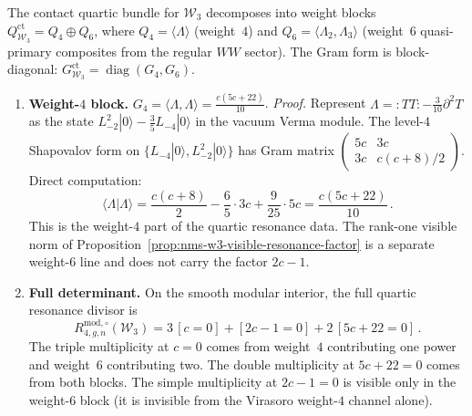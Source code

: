 \begin{theorem}%
\label{thm:nms-w3-full-quartic-gram}%
%
%
The contact quartic bundle for $\mathcal W_3$ decomposes into
weight blocks $Q^{\mathrm{ct}}_{\mathcal W_3} = Q_4 \oplus Q_6$, where
$Q_4 = \langle\Lambda\rangle$ (weight~$4$) and
$Q_6 = \langle\Lambda_2,\Lambda_3\rangle$ (weight~$6$
quasi-primary composites from the regular $WW$ sector).
The Gram form is block-diagonal:
$G^{\mathrm{ct}}_{\mathcal W_3} = \operatorname{diag}(G_4, G_6)$.
\begin{enumerate}[label=\textup{(\roman*)}]
\item \textbf{Weight-$4$ block.}
 $G_4 = \langle\Lambda,\Lambda\rangle = \frac{c(5c+22)}{10}$.
 \emph{Proof.} Represent $\Lambda = :TT: - \frac{3}{10}\partial^2 T$
 as the state $L_{-2}^2|0\rangle - \frac{3}{5}L_{-4}|0\rangle$
 in the vacuum Verma module. The level-$4$ Shapovalov form on
 $\{L_{-4}|0\rangle, L_{-2}^2|0\rangle\}$ has Gram matrix
 $\left(\begin{smallmatrix} 5c & 3c \\ 3c & c(c+8)/2 \end{smallmatrix}\right)$.
 Direct computation:
 \begin{equation}\label{eq:w3-lambda-norm}
 \langle\Lambda|\Lambda\rangle
 = \frac{c(c+8)}{2} - \frac{6}{5}\cdot 3c + \frac{9}{25}\cdot 5c
 = \frac{c(5c+22)}{10}\,.
 \end{equation}
 This is the weight-$4$ part of the quartic resonance data. The
 rank-one visible norm of
 Proposition~\textup{\ref{prop:nms-w3-visible-resonance-factor}}
 is a separate weight-$6$ line and does not carry the factor
 $2c-1$.

\item \textbf{Full determinant.}
 On the smooth modular interior, the full quartic resonance divisor is
 \begin{equation}\label{eq:w3-full-quartic-divisor}
 R^{\mathrm{mod},\circ}_{4,g,n}(\mathcal W_3)
 = 3\,[c{=}0] + [2c{-}1{=}0] + 2\,[5c{+}22{=}0]\,.
 \end{equation}
 The triple multiplicity at $c=0$ comes from weight~$4$
 contributing one power and weight~$6$ contributing two.
 The double multiplicity at $5c+22=0$ comes from both blocks.
 The simple multiplicity at $2c-1=0$ is visible only in the
 weight-$6$ block \textup{(}it is invisible from
 the Virasoro weight-$4$ channel alone\textup{)}.
\end{enumerate}
\end{theorem}

